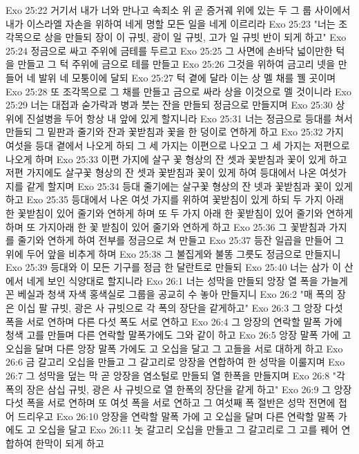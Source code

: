 Exo 25:22  거기서 내가 너와 만나고 속죄소 위 곧 증거궤 위에 있는 두 그 룹 사이에서 내가 이스라엘 자손을 위하여 네게 명할 모든 일을 네게 이르리라
Exo 25:23  "너는 조각목으로 상을 만들되 장이 이 규빗, 광이 일 규빗, 고가 일 규빗 반이 되게 하고"
Exo 25:24  정금으로 싸고 주위에 금테를 두르고
Exo 25:25  그 사면에 손바닥 넓이만한 턱을 만들고 그 턱 주위에 금으로 테를 만들고
Exo 25:26  그것을 위하여 금고리 넷을 만들어 네 발위 네 모퉁이에 달되
Exo 25:27  턱 곁에 달라 이는 상 멜 채를 꿸 곳이며
Exo 25:28  또 조각목으로 그 채를 만들고 금으로 싸라 상을 이것으로 멜 것이니라
Exo 25:29  너는 대접과 숟가락과 병과 붓는 잔을 만들되 정금으로 만들지며
Exo 25:30  상 위에 진설병을 두어 항상 내 앞에 있게 할지니라
Exo 25:31  너는 정금으로 등대를 쳐서 만들되 그 밑판과 줄기와 잔과 꽃받침과 꽃을 한 덩이로 연하게 하고
Exo 25:32  가지 여섯을 등대 곁에서 나오게 하되 그 세 가지는 이편으로 나오고 그 세 가지는 저편으로 나오게 하며
Exo 25:33  이편 가지에 살구 꽃 형상의 잔 셋과 꽃받침과 꽃이 있게 하고 저편 가지에도 살구꽃 형상의 잔 셋과 꽃받침과 꽃이 있게 하여 등대에서 나온 여섯가지를 같게 할지며
Exo 25:34  등대 줄기에는 살구꽃 형상의 잔 넷과 꽃받침과 꽃이 있게 하고
Exo 25:35  등대에서 나온 여섯 가지를 위하여 꽃받침이 있게 하되 두 가지 아래 한 꽃받침이 있어 줄기와 연하게 하며 또 두 가지 아래 한 꽃받침이 있어 줄기와 연하게 하며 또 가지아래 한 꽃 받침이 있어 줄기와 연하게 하고
Exo 25:36  그 꽃받침과 가지를 줄기와 연하게 하여 전부를 정금으로 쳐 만들고
Exo 25:37  등잔 일곱을 만들어 그 위에 두어 앞을 비추게 하며
Exo 25:38  그 불집게와 불똥 그릇도 정금으로 만들지니
Exo 25:39  등대와 이 모든 기구를 정금 한 달란트로 만들되
Exo 25:40  너는 삼가 이 산에서 네게 보인 식양대로 할지니라
Exo 26:1  너는 성막을 만들되 앙장 열 폭을 가늘게 꼰 베실과 청색 자색 홍색실로 그룹을 공교히 수 놓아 만들지니
Exo 26:2  "매 폭의 장은 이십 팔 규빗, 광은 사 규빗으로 각 폭의 장단을 같게하고"
Exo 26:3  그 앙장 다섯 폭을 서로 연하며 다른 다섯 폭도 서로 연하고
Exo 26:4  그 앙장의 연락할 말폭 가에 청색 고를 만들며 다른 연락할 말폭가에도 그와 같이 하고
Exo 26:5  앙장 말폭 가에 고 오십을 달며 다른 앙장 말폭 가에도 고 오십을 달고 그 고들을 서로 대하게 하고
Exo 26:6  금 갈고리 오십을 만들고 그 갈고리로 앙장을 연합하여 한 성막을 이룰지며
Exo 26:7  그 성막을 덮는 막 곧 앙장을 염소털로 만들되 열 한폭을 만들지며
Exo 26:8  "각 폭의 장은 삼십 규빗, 광은 사 규빗으로 열 한폭의 장단을 같게 하고"
Exo 26:9  그 앙장 다섯 폭을 서로 연하며 또 여섯 폭을 서로 연하고 그 여섯째 폭 절반은 성막 전면에 접어 드리우고
Exo 26:10  앙장을 연락할 말폭 가에 고 오십을 달며 다른 연락할 말폭 가에도 고 오십을 달고
Exo 26:11  놋 갈고리 오십을 만들고 그 갈고리로 그 고를 꿰어 연합하여 한막이 되게 하고
